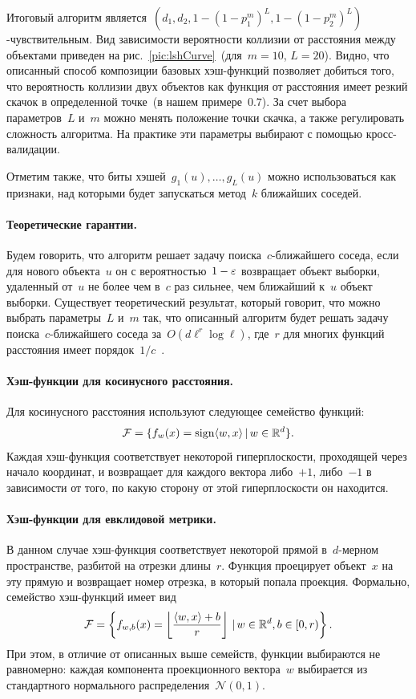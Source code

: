 \documentclass[12pt,fleqn]{article}
\begin{document}
Итоговый алгоритм является~$(d_1, d_2, 1 - (1 - p_1^m)^L, 1 - (1 - p_2^m)^L)$-чувствительным.
Вид зависимости вероятности коллизии от расстояния между объектами приведен
на рис.~\ref{pic:lshCurve}~(для~$m = 10$, $L = 20$).
Видно, что описанный способ композиции базовых хэш-функций позволяет добиться того,
что вероятность коллизии двух объектов как функция от расстояния имеет резкий скачок
в определенной точке~(в нашем примере~$0.7$).
За счет выбора параметров~$L$ и~$m$ можно менять положение точки скачка,
а также регулировать сложность алгоритма.
На практике эти параметры выбирают с помощью кросс-валидации.

Отметим также, что биты хэшей~$g_1(u), \dots, g_L(u)$ можно использоваться как признаки,
над которыми будет запускаться метод~$k$ ближайших соседей.

\paragraph{Теоретические гарантии.}
Будем говорить, что алгоритм решает задачу поиска~$c$-ближайшего соседа,
если для нового объекта~$u$ он с вероятностью~$1 - \varepsilon$ возвращает объект выборки,
удаленный от~$u$ не более чем в~$c$ раз сильнее, чем ближайший к~$u$ объект выборки.
Существует теоретический результат, который говорит, что можно выбрать параметры~$L$ и~$m$
так, что описанный алгоритм будет решать задачу поиска~$c$-ближайшего соседа
за~$O(d \ell^r \log \ell)$, где~$r$ для многих функций расстояния имеет порядок~$1/c$~\cite{andoni08survey}.

\paragraph{Хэш-функции для косинусного расстояния.}
Для косинусного расстояния используют следующее семейство функций:
\[
    \mathcal{F}
    =
    \{
        f_w(x) = \mathop{\rm sign}\limits \langle w, x \rangle \mspace{3mu}{|}\mspace{3mu} w \in \mathbb{R}^d
    \}.
\]
Каждая хэш-функция соответствует некоторой гиперплоскости, проходящей через
начало координат, и возвращает для каждого вектора либо~$+1$, либо~$-1$
в зависимости от того, по какую сторону от этой гиперплоскости он находится.

\paragraph{Хэш-функции для евклидовой метрики.}
В данном случае хэш-функция соответствует некоторой прямой в~$d$-мерном пространстве,
разбитой на отрезки длины~$r$.
Функция проецирует объект~$x$ на эту прямую и возвращает номер отрезка, в который попала проекция.
Формально, семейство хэш-функций имеет вид
\[
    \mathcal{F}
    =
    \left\{
        f_{w, b}(x) = \left\lfloor \frac{\langle w, x \rangle + b}{r} \right\rfloor \mspace{3mu}{|}\mspace{3mu} w \in \mathbb{R}^d, b \in [0, r)
    \right\}.
\]
При этом, в отличие от описанных выше семейств, функции выбираются не равномерно:
каждая компонента проекционного вектора~$w$ выбирается из стандартного нормального
распределения~$\mathcal{N}(0, 1)$.
\end{document}
